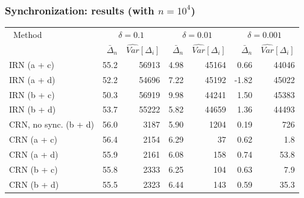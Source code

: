 \documentclass[t,usepdftitle=false]{beamer}
\begin{document}
\begin{frame}
	\frametitle{Synchronization: results (with ${n=10^4}$)}
	
	\begin{footnotesize}
		\begin{center}
			\begin{tabular}{|l|rr|rr|rr|}
				\hline
				\ Method
				& \multicolumn{2}{|c}{$\delta = 0.1$}
				& \multicolumn{2}{|c}{$\delta = 0.01$}
				& \multicolumn{2}{|c|}{$\delta = 0.001$} \\
				& $\bar \Delta_n$ & $\widehat{Var}[\Delta_i]$
				& $\bar \Delta_n$ & $\widehat{Var}[\Delta_i]$
				& $\bar \Delta_n$ & $\widehat{Var}[\Delta_i]$\\
				\hline
				IRN (a + c)                      &  55.2 & 56913 &  4.98 & 45164 &  0.66 & 44046 \\
				IRN (a + d)                      &  52.2 & 54696 &  7.22 & 45192 & -1.82 & 45022 \\
				IRN (b + c)                      &  50.3 & 56919 &  9.98 & 44241 &  1.50 & 45383 \\
				IRN (b + d)                      &  53.7 & 55222 &  5.82 & 44659 &  1.36 & 44493 \\
				CRN, no sync. (b + d)            &  56.0 &  3187 &  5.90 &  1204 &  0.19 &   726 \\
				CRN (a + c)                      &  56.4 &  2154 &  6.29 &    37 &  0.62 &   1.8 \\
				CRN (a + d)                      &  55.9 &  2161 &  6.08 &   158 &  0.74 &  53.8 \\
				CRN (b + c)                      &  55.8 &  2333 &  6.25 &   104 &  0.63 &   7.9 \\
				CRN (b + d)                      &  55.5 &  2323 &  6.44 &   143 &  0.59 &  35.3 \\
				\hline
			\end{tabular}
		\end{center}
	\end{footnotesize}
	
\end{frame}
\end{document}
